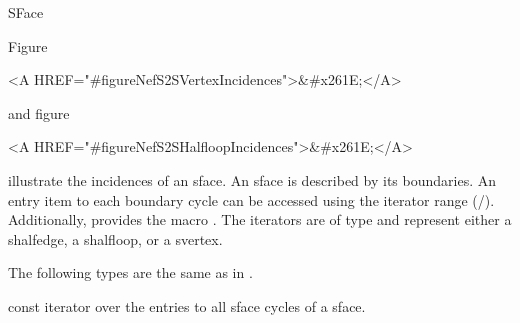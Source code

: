 
\ccRefPageBegin



\begin{ccRefClass}{SFace}

\ccDefinition

Figure~\begin{ccHtmlOnly}
  <A HREF="#figureNefS2SVertexIncidences">&#x261E;</A>
\end{ccHtmlOnly} and
figure~\begin{ccHtmlOnly}
  <A HREF="#figureNefS2SHalfloopIncidences">&#x261E;</A>
\end{ccHtmlOnly} illustrate the incidences of an sface. An sface is described
by its boundaries. An entry item to each boundary cycle can be accessed
using the iterator range (/).
Additionally,  provides the macro 
. The iterators are of type 
 and represent either a shalfedge, a shalfloop,
or a svertex.



\ccTypes
{}
\ccThreeToTwo

The following types are the same as in .



\ccGlue
{}
\ccGlue
{}
\ccGlue
{}
{const iterator over the entries to all sface cycles of a sface.}


\end{ccRefClass}
